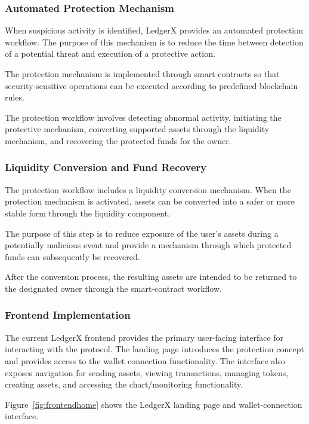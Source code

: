 \documentclass{tietreport}
\begin{document}
\subsubsection{Automated Protection Mechanism}

When suspicious activity is identified, LedgerX provides an
automated protection workflow. The purpose of this mechanism is to
reduce the time between detection of a potential threat and
execution of a protective action.

The protection mechanism is implemented through smart contracts so
that security-sensitive operations can be executed according to
predefined blockchain rules.

The protection workflow involves detecting abnormal activity,
initiating the protective mechanism, converting supported assets
through the liquidity mechanism, and recovering the protected funds
for the owner.

\subsubsection{Liquidity Conversion and Fund Recovery}

The protection workflow includes a liquidity conversion mechanism.
When the protection mechanism is activated, assets can be converted
into a safer or more stable form through the liquidity component.

The purpose of this step is to reduce exposure of the user's assets
during a potentially malicious event and provide a mechanism through
which protected funds can subsequently be recovered.

After the conversion process, the resulting assets are intended to be
returned to the designated owner through the smart-contract workflow.

\subsubsection{Frontend Implementation}

The current LedgerX frontend provides the primary user-facing
interface for interacting with the protocol. The landing page
introduces the protection concept and provides access to the wallet
connection functionality. The interface also exposes navigation for
sending assets, viewing transactions, managing tokens, creating
assets, and accessing the chart/monitoring functionality.

Figure~\ref{fig:frontendhome} shows the LedgerX landing page and
wallet-connection interface.
\end{document}
